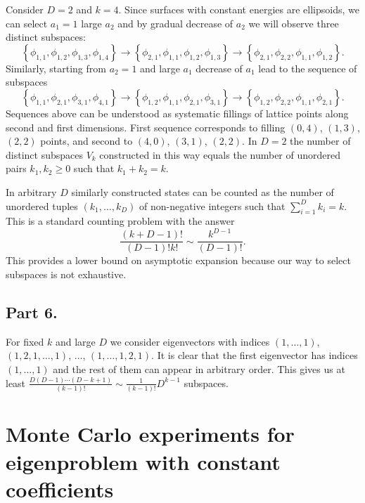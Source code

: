 \documentclass{article}
\begin{document}
Consider $D=2$ and $k=4$. Since surfaces with constant energies are ellipsoids, we can select $a_1 = 1$ large $a_2$ and by gradual decrease of $a_2$ we will observe three distinct subspaces:
\begin{equation}
	\left\{\phi_{1, 1}, \phi_{1, 2}, \phi_{1, 3}, \phi_{1, 4}\right\} \rightarrow \left\{\phi_{2, 1}, \phi_{1, 1}, \phi_{1, 2}, \phi_{1, 3}\right\}  \rightarrow \left\{\phi_{2, 1}, \phi_{2, 2}, \phi_{1, 1}, \phi_{1, 2}\right\}.
\end{equation}
Similarly, starting from $a_2 =1$ and large $a_1$ decrease of $a_1$ lead to the sequence of subspaces
\begin{equation}
	\left\{\phi_{1, 1}, \phi_{2, 1}, \phi_{3, 1}, \phi_{4, 1}\right\} \rightarrow \left\{\phi_{1, 2}, \phi_{1, 1}, \phi_{2, 1}, \phi_{3, 1}\right\}  \rightarrow \left\{\phi_{1, 2}, \phi_{2, 2}, \phi_{1, 1}, \phi_{2, 1}\right\}.
\end{equation}
Sequences above can be understood as systematic fillings of lattice points along second and first dimensions. First sequence corresponds to filling $(0, 4)$, $(1, 3)$, $(2, 2)$ points, and second to $(4, 0)$, $(3, 1)$, $(2, 2)$. In $D=2$ the number of distinct subspaces $V_k$ constructed in this way equals the number of unordered pairs $k_1, k_2 \geq 0$ such that $k_1 + k_2 = k$. 

In arbitrary $D$ similarly constructed states can be counted as the number of unordered tuples $(k_1,\dots, k_D)$ of non-negative integers such that $\sum_{i=1}^{D}k_i = k$. This is a standard counting problem with the answer
\begin{equation}
	\frac{(k + D - 1)!}{(D-1)! k!} \sim \frac{k^{D-1}}{(D-1)!}.
\end{equation}
This provides a lower bound on asymptotic expansion because our way to select subspaces is not exhaustive.

\subsection{Part 6.}
For fixed $k$ and large $D$ we consider eigenvectors with indices $\left(1,\dots, 1\right)$, $\left(1, 2, 1, \dots, 1\right)$, $\dots$, $\left(1, \dots, 1, 2, 1\right)$. It is clear that the first eigenvector has indices $\left(1,\dots, 1\right)$ and the rest of them can appear in arbitrary order. This gives us at least $\frac{D(D-1)\cdots (D - k+1)}{(k-1)!}\sim \frac{1}{(k-1)!}D^{k-1}$ subspaces.

\section{Monte Carlo experiments for eigenproblem with constant coefficients}
\label{appendix:monte_carlo_example}
\end{document}
